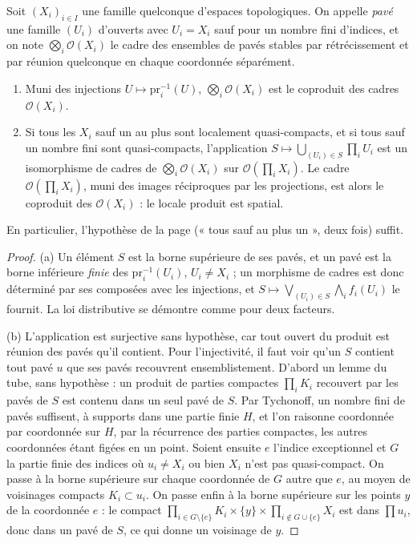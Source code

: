 \begin{encadre}
\begin{enonce}
Soit $(X_i)_{i \in I}$ une famille quelconque d'espaces topologiques. On appelle \emph{pavé} une famille $(U_i)$ d'ouverts avec $U_i = X_i$ sauf pour un nombre fini d'indices, et on note $\bigotimes_i \mathcal O(X_i)$ le cadre des ensembles de pavés stables par rétrécissement et par réunion quelconque en chaque coordonnée séparément.
\begin{enumerate}
\item[(a)] Muni des injections $U \mapsto \mathrm{pr}_i^{-1}(U)$, $\bigotimes_i \mathcal O(X_i)$ est le coproduit des cadres $\mathcal O(X_i)$.
\item[(b)] Si tous les $X_i$ sauf un au plus sont localement quasi-compacts, et si tous sauf un nombre fini sont quasi-compacts, l'application $S \mapsto \bigcup_{(U_i) \in S} \prod_i U_i$ est un isomorphisme de cadres de $\bigotimes_i \mathcal O(X_i)$ sur $\mathcal O(\prod_i X_i)$. Le cadre $\mathcal O(\prod_i X_i)$, muni des images réciproques par les projections, est alors le coproduit des $\mathcal O(X_i)$ : le locale produit est spatial.
\end{enumerate}
En particulier, l'hypothèse de la page (« tous sauf au plus un », deux fois) suffit.
\end{enonce}
\end{encadre}

\begin{proof}
(a) Un élément $S$ est la borne supérieure de ses pavés, et un pavé est la borne inférieure \emph{finie} des $\mathrm{pr}_i^{-1}(U_i)$, $U_i \neq X_i$ ; un morphisme de cadres est donc déterminé par ses composées avec les injections, et $S \mapsto \bigvee_{(U_i) \in S} \bigwedge_i f_i(U_i)$ le fournit. La loi distributive se démontre comme pour deux facteurs.

(b) L'application est surjective sans hypothèse, car tout ouvert du produit est réunion des pavés qu'il contient. Pour l'injectivité, il faut voir qu'un $S$ contient tout pavé $u$ que ses pavés recouvrent ensemblistement. D'abord un lemme du tube, sans hypothèse : un produit de parties compactes $\prod_i K_i$ recouvert par les pavés de $S$ est contenu dans un seul pavé de $S$. Par Tychonoff, un nombre fini de pavés suffisent, à supports dans une partie finie $H$, et l'on raisonne coordonnée par coordonnée sur $H$, par la récurrence des parties compactes, les autres coordonnées étant figées en un point. Soient ensuite $e$ l'indice exceptionnel et $G$ la partie finie des indices où $u_i \neq X_i$ ou bien $X_i$ n'est pas quasi-compact. On passe à la borne supérieure sur chaque coordonnée de $G$ autre que $e$, au moyen de voisinages compacts $K_i \subset u_i$. On passe enfin à la borne supérieure sur les points $y$ de la coordonnée $e$ : le compact $\prod_{i \in G \setminus \{e\}} K_i \times \{y\} \times \prod_{i \notin G \cup \{e\}} X_i$ est dans $\prod u_i$, donc dans un pavé de $S$, ce qui donne un voisinage de $y$.
\end{proof}


